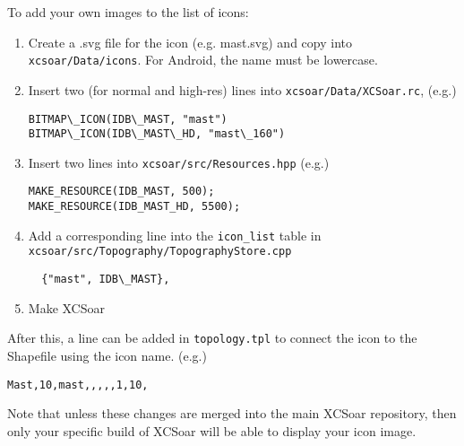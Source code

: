To add your own images to the list of icons:
\begin{enumerate}
\item Create a .svg file for the icon (e.g. mast.svg) and copy into \texttt{xcsoar/Data/icons}. For Android, the name must be lowercase.
\item Insert two (for normal and high-res) lines into \texttt{xcsoar/Data/XCSoar.rc},  (e.g.)
\begin{verbatim}
BITMAP\_ICON(IDB\_MAST, "mast")
BITMAP\_ICON(IDB\_MAST\_HD, "mast\_160")
\end{verbatim}
\item Insert two lines into \texttt{xcsoar/src/Resources.hpp} (e.g.)
\begin{verbatim}
MAKE_RESOURCE(IDB_MAST, 500);
MAKE_RESOURCE(IDB_MAST_HD, 5500);
\end{verbatim}
\item Add a corresponding line into the \texttt{icon\_list} table in \texttt{xcsoar/src/Topography/TopographyStore.cpp}
\begin{verbatim}
  {"mast", IDB\_MAST},
\end{verbatim}
\item Make XCSoar
\end{enumerate} 
After this, a line can be added in \texttt{topology.tpl} to connect the icon to the Shapefile using the icon name. (e.g.)
\begin{verbatim}
Mast,10,mast,,,,,1,10,
\end{verbatim}

Note that unless these changes are merged into the main XCSoar repository, then only your specific build of XCSoar will be able to 
display your icon image.
